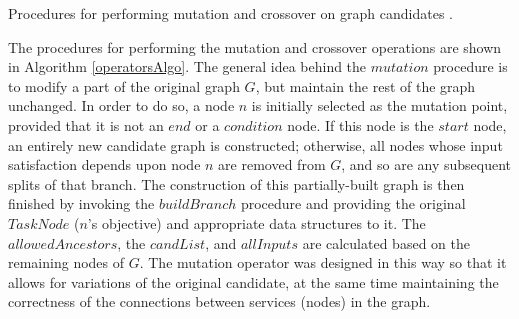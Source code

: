 \begin{algorithm}
 \setlength{}
  
  
 \LinesNumbered
 \SetNlSty{}{}{:}

 
 
 \caption{\footnotesize Procedures for performing mutation and crossover on graph candidates \protect\cite{sawczuk2015graphevol}.}
\label{operatorsAlgo}
\end{algorithm}

The procedures for performing the mutation and crossover operations are shown in Algorithm \ref{operatorsAlgo}. The general idea behind the $mutation$ procedure is to modify a part of the original graph $G$, but maintain the rest of the graph unchanged. In order to do so, a node $n$ is initially selected as the mutation point, provided that it is not an $end$ or a $condition$ node. If this node is the $start$ node, an entirely new candidate graph is constructed; otherwise, all nodes whose input satisfaction depends upon node $n$ are removed from $G$, and so are any subsequent splits of that branch. The construction of this partially-built graph is then finished by invoking the $buildBranch$ procedure and providing the original $TaskNode$ ($n$'s objective) and appropriate data structures to it. The $allowedAncestors$, the $candList$, and $allInputs$ are calculated based on the remaining nodes of $G$. The mutation operator was designed in this way so that it allows for variations of the original candidate, at the same time maintaining the correctness of the connections between services (nodes) in the graph.

